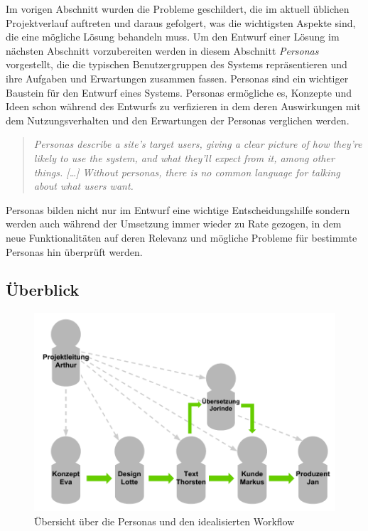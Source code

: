Im vorigen Abschnitt wurden die Probleme geschildert, die im aktuell üblichen Projektverlauf auftreten und daraus gefolgert, was die wichtigsten Aspekte sind, die eine mögliche Lösung behandeln muss. Um den Entwurf einer Lösung im nächsten Abschnitt vorzubereiten werden in diesem Abschnitt \emph{Personas} vorgestellt, die die typischen Benutzergruppen des Systems repräsentieren und ihre Aufgaben und Erwartungen zusammen fassen. Personas sind ein wichtiger Baustein für den Entwurf eines Systems. Personas ermögliche es, Konzepte und Ideen schon während des Entwurfs zu verfizieren in dem deren Auswirkungen mit dem Nutzungsverhalten und den Erwartungen der Personas verglichen werden.

\begin{quote}
\textit{Personas describe a site’s target users, giving a clear picture of how they’re likely to use the system, and what they’ll expect from it, among other
things. […] Without personas, there is no common language for talking about what users want.} \cite[S.15 ff.]{brown2007communicating}
\end{quote}

Personas bilden nicht nur im Entwurf eine wichtige Entscheidungshilfe sondern werden auch während der Umsetzung immer wieder zu Rate gezogen, in dem neue Funktionalitäten auf deren Relevanz und mögliche Probleme für bestimmte Personas hin überprüft werden. \cite[S.38 ff.]{cohn2004user}

\subsection{Überblick}

\begin{figure}[htb]
\begin{center}
\includegraphics[width=\textwidth]{media/Uebersicht-Personas.pdf}
\caption{Übersicht über die Personas und den idealisierten Workflow}
\label{chart:uebersicht-personas}
\end{center}
\end{figure}

